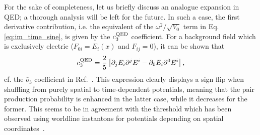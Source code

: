 \documentclass[12pt,a4paper]{article}
\numberwithin{equation}{section}
\numberwithin{equation}{section}
\begin{document}
For the sake of completeness, let us briefly discuss an analogue expansion  in QED; a thorough analysis will be  left for the future. In such a case, the first derivative contribution, i.e. the equivalent of the $\omega^2/\sqrt{V_0}$ term in Eq. \eqref{eq:im_time_sine}, is given by the $c_3^{\rm QED}$ coefficient. For a background field which is exclusively electric ($F_{0i}=E_i(x)$ and $F_{ij}=0$), it can be shown that 
\begin{align}
    c_3^{\rm QED}=\frac{2}{5}\left[ \partial_j E_i  \partial^j E^i - \partial_0 E_i \partial^0 E^i \right],
\end{align}
cf. the $\bar{o}_3$ coefficient in Ref.~\cite{Navarro-Salas:2020oew}.
This expression clearly displays a sign flip when shuffling from purely spatial to time-dependent potentials, meaning that the pair production probability is enhanced in the latter case, while it decreases for the former. This seems to be in agreement with the threshold which has been observed using worldline instantons for potentials depending on spatial coordinates~\cite{Dunne:2006st}.


\end{document}
